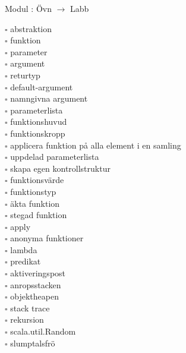 
    Modul : Övn  $\rightarrow$ Labb 
    \begin{multicols}{3}\SlideFontTiny
    $\square$ abstraktion \\
$\square$ funktion \\
$\square$ parameter \\
$\square$ argument \\
$\square$ returtyp \\
$\square$ default-argument \\
$\square$ namngivna argument \\
$\square$ parameterlista \\
$\square$ funktionshuvud \\
$\square$ funktionskropp \\
$\square$ applicera funktion på alla element i en samling \\
$\square$ uppdelad parameterlista \\
$\square$ skapa egen kontrollstruktur \\
$\square$ funktionsvärde \\
$\square$ funktionstyp \\
$\square$ äkta funktion \\
$\square$ stegad funktion \\
$\square$ apply \\
$\square$ anonyma funktioner \\
$\square$ lambda \\
$\square$ predikat \\
$\square$ aktiveringspost \\
$\square$ anropsstacken \\
$\square$ objektheapen \\
$\square$ stack trace \\
$\square$ rekursion \\
$\square$ scala.util.Random \\
$\square$ slumptalsfrö \\
    \end{multicols}
    